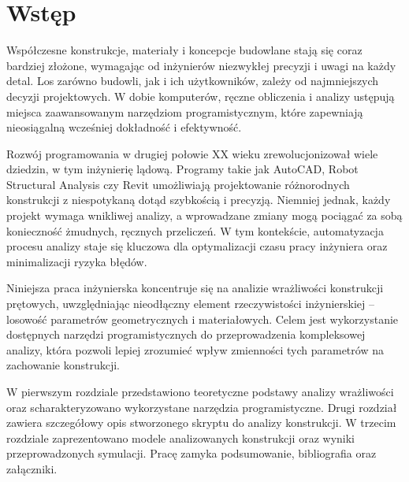 \section*{Wstęp}

Współczesne konstrukcje, materiały i koncepcje budowlane stają się coraz bardziej złożone, wymagając od inżynierów niezwykłej precyzji i uwagi na każdy detal.
Los zarówno budowli, jak i ich użytkowników, zależy od najmniejszych decyzji projektowych.
W dobie komputerów, ręczne obliczenia i analizy ustępują miejsca zaawansowanym narzędziom programistycznym, które zapewniają nieosiągalną wcześniej dokładność i efektywność.

Rozwój programowania w drugiej połowie XX wieku zrewolucjonizował wiele dziedzin, w tym inżynierię lądową.
Programy takie jak AutoCAD, Robot Structural Analysis czy Revit umożliwiają projektowanie różnorodnych konstrukcji z niespotykaną dotąd szybkością i precyzją.
Niemniej jednak, każdy projekt wymaga wnikliwej analizy, a wprowadzane zmiany mogą pociągać za sobą konieczność żmudnych, ręcznych przeliczeń.
W tym kontekście, automatyzacja procesu analizy staje się kluczowa dla optymalizacji czasu pracy inżyniera oraz minimalizacji ryzyka błędów.

Niniejsza praca inżynierska koncentruje się na analizie wrażliwości konstrukcji prętowych, uwzględniając nieodłączny element rzeczywistości inżynierskiej – losowość parametrów geometrycznych i materiałowych.
Celem jest wykorzystanie dostępnych narzędzi programistycznych do przeprowadzenia kompleksowej analizy, która pozwoli lepiej zrozumieć wpływ zmienności tych parametrów na zachowanie konstrukcji.

W pierwszym rozdziale przedstawiono teoretyczne podstawy analizy wrażliwości oraz scharakteryzowano wykorzystane narzędzia programistyczne.
Drugi rozdział zawiera szczegółowy opis stworzonego skryptu do analizy konstrukcji.
W trzecim rozdziale zaprezentowano modele analizowanych konstrukcji oraz wyniki przeprowadzonych symulacji.
Pracę zamyka podsumowanie, bibliografia oraz załączniki.
